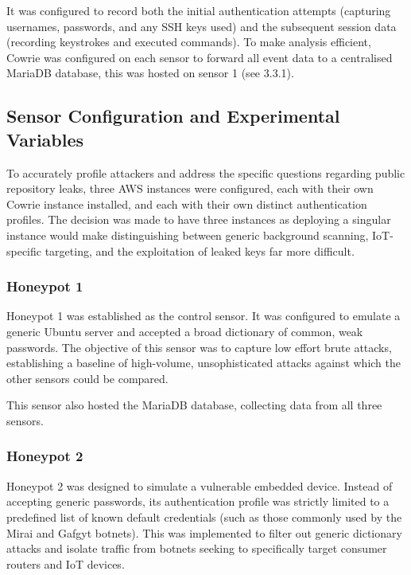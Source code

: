 \documentclass[]{article}
\begin{document}
It was configured to record both the initial authentication attempts (capturing usernames, passwords, and any SSH keys used) and the subsequent session data (recording keystrokes and executed commands). To make analysis efficient, Cowrie was configured on each sensor to forward all event data to a centralised MariaDB database, this was hosted on sensor 1 (see 3.3.1).

\subsection{Sensor Configuration and Experimental Variables}

To accurately profile attackers and address the specific questions regarding public repository leaks, three AWS instances were configured, each with their own Cowrie instance installed, and each with their own distinct authentication profiles. The decision was made to have three instances as deploying a singular instance would make distinguishing between generic background scanning, IoT-specific targeting, and the exploitation of leaked keys far more difficult.

\subsubsection{Honeypot 1}

Honeypot 1 was established as the control sensor. It was configured to emulate a generic Ubuntu server and accepted a broad dictionary of common, weak passwords. The objective of this sensor was to capture low effort brute attacks, establishing a baseline of high-volume, unsophisticated attacks against which the other sensors could be compared.

This sensor also hosted the MariaDB database, collecting data from all three sensors.

\subsubsection{Honeypot 2}

Honeypot 2 was designed to simulate a vulnerable embedded device. Instead of accepting generic passwords, its authentication profile was strictly limited to a predefined list of known default credentials (such as those commonly used by the Mirai and Gafgyt botnets). This was implemented to filter out generic dictionary attacks and isolate traffic from botnets seeking to specifically target consumer routers and IoT devices.
\end{document}
